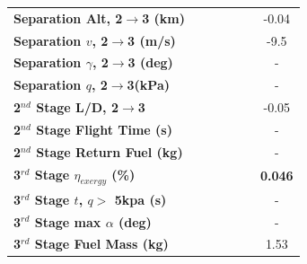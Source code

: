 \begin{table}[ht]
\begin{tabular}{l c c c c c c}
	\\
	\textbf{Separation Alt, 2$\rightarrow$3 (km)}
	& \secondthirdSeparationAltCdNinety
	& \secondthirdSeparationAltCdNinetyFive
	& \secondthirdSeparationAltCdStandard
	& \secondthirdSeparationAltCdOneHundredFive
	& \secondthirdSeparationAltCdOneHundredTen
	&-0.04
	\\
	\textbf{Separation $v$, 2$\rightarrow$3 (m/s)}
	& \secondthirdSeparationvCdNinety
	& \secondthirdSeparationvCdNinetyFive
	& \secondthirdSeparationvCdStandard
	& \secondthirdSeparationvCdOneHundredFive
	& \secondthirdSeparationvCdOneHundredTen
	&-9.5
	\\
	\textbf{Separation $\gamma$, 2$\rightarrow$3 (deg)}
	& \secondthirdSeparationgammaCdNinety
	& \secondthirdSeparationgammaCdNinetyFive
	& \secondthirdSeparationgammaCdStandard
	& \secondthirdSeparationgammaCdOneHundredFive
	& \secondthirdSeparationgammaCdOneHundredTen
	& -
	\\
	\textbf{Separation $q$, 2$\rightarrow$3(kPa)}
	& \secondthirdSeparationqCdNinety
	& \secondthirdSeparationqCdNinetyFive
	& \secondthirdSeparationqCdStandard
	& \secondthirdSeparationqCdOneHundredFive
	& \secondthirdSeparationqCdOneHundredTen
	& -
	\\
	\textbf{2$^{nd}$ Stage L/D, 2$\rightarrow$3}
	& \secondthirdSeparationLDCdNinety
	& \secondthirdSeparationLDCdNinetyFive
	& \secondthirdSeparationLDCdStandard
	& \secondthirdSeparationLDCdOneHundredFive
	& \secondthirdSeparationLDCdOneHundredTen
	&-0.05
	\\
	\textbf{2$^{nd}$ Stage Flight Time (s)}
	& \secondFlightTimeCdNinety
	& \secondFlightTimeCdNinetyFive
	& \secondFlightTimeCdStandard
	& \secondFlightTimeCdOneHundredFive
	& \secondFlightTimeCdOneHundredTen
	& -
	\\
	\textbf{2$^{nd}$ Stage Return Fuel (kg)}
	& \returnFuelCdNinety
	& \returnFuelCdNinetyFive
	& \returnFuelCdStandard
	& \returnFuelCdOneHundredFive
	& \returnFuelCdOneHundredTen
	& -
	\\
	\hline 
	\textbf{3$^{rd}$ Stage $\eta_{exergy}$ (\%)}
	& \textbf{\thirddExergyEffCdNinety}
	& \textbf{\thirddExergyEffCdNinetyFive}
	& \textbf{\thirddExergyEffCdStandard}
	& \textbf{\thirddExergyEffCdOneHundredFive}
	& \textbf{\thirddExergyEffCdOneHundredTen}
	& \textbf{0.046}
	\\
	
	\textbf{3$^{rd}$ Stage $t$, $q >$ 5kpa (s)}
	& \thirdqOverFiveCdNinety
	& \thirdqOverFiveCdNinetyFive
	& \thirdqOverFiveCdStandard
	& \thirdqOverFiveCdOneHundredFive
	& \thirdqOverFiveCdOneHundredTen
	& -
	\\
	\textbf{3$^{rd}$ Stage max $\alpha$ (deg)}
	& \thirdmaxAoACdNinety
	& \thirdmaxAoACdNinetyFive
	& \thirdmaxAoACdStandard
	& \thirdmaxAoACdOneHundredFive
	& \thirdmaxAoACdOneHundredTen
	& -
	\\
	\textbf{3$^{rd}$ Stage Fuel Mass (kg)}
	& \thirdmFuelCdNinety
	& \thirdmFuelCdNinetyFive
	& \thirdmFuelCdStandard
	& \thirdmFuelCdOneHundredFive
	& \thirdmFuelCdOneHundredTen
	&1.53
	\\
	\hline 
\end{tabular} 
\end{table}


